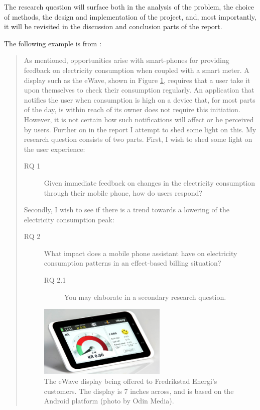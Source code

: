 The research question will surface both in the analysis of the problem, the choice of methods, the design and implementation of the project, and,  most importantly, it will be revisited in the discussion and conclusion parts of the report.

The following example is from  \parencite{killerud14sgs}:

\begin{quotation}
As mentioned, opportunities arise with smart-phones for providing feedback on electricity consumption when coupled with a smart meter. A display such as the eWave, shown in Figure \ref{fig:display}, requires that a user take it upon themselves to check their consumption regularly. An application that notifies the user when consumption is high on a device that, for most parts of the day, is within reach of its owner does not require this initiation. However, it is not certain how such notifications will affect or be perceived by users. Further on in the report I attempt to shed some light on this.
My research question consists of two parts. First, I wish to shed some light on the user experience:


\begin{description}
\item [RQ 1] Given immediate feedback on changes in the electricity consumption through their mobile phone, how do users respond?
\end{description}

Secondly, I wish to see if there is a trend towards a lowering of the electricity consumption peak:

\begin{description}
\item [RQ 2]  What impact does a mobile phone assistant have on electricity consumption patterns in an effect-based billing situation?
\begin{description}
\item [RQ 2.1] You may elaborate in a secondary research question.
\end{description}
\end{description}

\begin{figure}[!htbp]
    \center
    \includegraphics[width=0.6\textwidth]{Graphics/display}
    \caption{The eWave display being offered to Fredrikstad Energi’s customers. The display is 7 inches across, and is based on the Android platform (photo by Odin Media).}
    \label{fig:display}
\end{figure}

\end{quotation}

